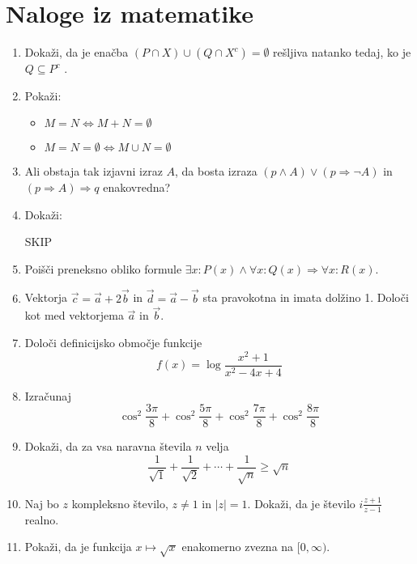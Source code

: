 \documentclass[a4paper,12pt]{article}
\begin{document}
\section*{Naloge iz matematike}
\begin{enumerate}

\item
Dokaži, da je enačba $(P \cap X) \cup (Q \cap X^c) = \emptyset$ rešljiva natanko tedaj, ko je $Q \subseteq P^c$ .

\item
Pokaži:
\begin{itemize}
\item
$M=N \iff M + N = \emptyset$
\item
$M=N= \emptyset \iff M \cup N = \emptyset$
\end{itemize}

\item
Ali obstaja tak izjavni izraz $A$, da bosta izraza $(p \land A) \vee (p \Rightarrow \neg A) $ in $(p \Rightarrow A) \Rightarrow q$ enakovredna?

\item
Dokaži:

SKIP

\item
Poišči preneksno obliko formule $\exists x:P(x) \land \forall x:Q(x) \Rightarrow \forall x:R(x) $.

\item
Vektorja $\vec{c} = \vec{a} + 2\vec{b}$ in $\vec{d}=\vec{a} - \vec{b}$ sta pravokotna in imata dolžino 1. Določi kot med vektorjema $\vec{a}$ in $\vec{b}$.

\item
Določi definicijsko območje funkcije $$f(x)= \log \frac{x^2 + 1}{x^2 - 4x + 4} $$

\item
Izračunaj $$\cos ^2 \frac{3\pi}{8}+\cos ^2 \frac{5\pi}{8}+\cos ^2 \frac{7\pi}{8}+\cos ^2 \frac{8\pi}{8} $$

\item
Dokaži, da za vsa naravna števila $n$ velja $$\frac{1}{\sqrt{1}}+\frac{1}{\sqrt{2}}+\cdots+\frac{1}{\sqrt{n}}\ge \sqrt{n} $$

\item
Naj bo $z$ kompleksno število, $z \neq 1$ in $|z| = 1$. Dokaži, da je število $i\frac{z+1}{z-1}$ realno.

\item
Pokaži, da je funkcija $x\mapsto \sqrt{x} $ enakomerno zvezna na $\lbrack 0,\infty)$.


\end{enumerate}
\end{document}
